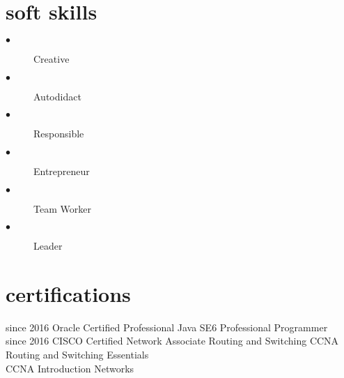 \documentclass[]{friggeri-cv}
\begin{document}
\section{soft skills}
\begin{multicols}{2}
\begin{description}
  \item[$\bullet$] Creative
  \item[$\bullet$] Autodidact
  \item[$\bullet$] Responsible
  \item[$\bullet$] Entrepreneur
  \item[$\bullet$] Team Worker
  \item[$\bullet$] Leader
\end{description}
\end{multicols}


\section{certifications}

\begin{entrylist}
  \entry
    {since 2016}
    {Oracle}
    {Certified Professional}
    {Java SE6 Professional Programmer\\}
  \entry
    {since 2016}
    {CISCO}
    {Certified Network Associate Routing and Switching}
    {CCNA Routing and Switching Essentials \\
    CCNA Introduction Networks}
\end{entrylist}

% 
\end{document}
